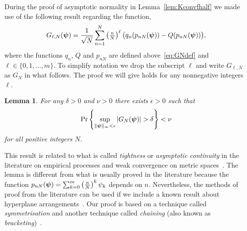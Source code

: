 \documentclass[aap,preprint]{imsart}
\newcommand{\prob}{\operatorname{Pr}}
\newcommand{\abs}[1]{\left\vert #1 \right\vert}
\newtheorem{lemma}{Lemma}
\begin{document}
During the proof of asymptotic normality in Lemma~\ref{lem:Kconvfhalf} we made use of the following result regarding the function,
\[
G_{\ell,N}(\boldsymbol{\psi}) = \frac{1}{\sqrt{N}} \sum_{n=1}^{N}\left( \tfrac{n}{N}\right)^\ell  \big(q_n(p_{nN}(\boldsymbol{\psi})) - Q(p_{nN}(\boldsymbol{\psi})) \big),
\]
where the functions $q_n$, $Q$ and $p_{nN}$ are defined above~\eqref{eq:GNdef} and $\ell \in \{0, 1, \dots, m\}$.  To simplify notation we drop the subscript $\ell$ and write $G_{\ell,N}$ as $G_N$ in what follows.  The proof we will give holds for any nonnegative integers $\ell$.

\begin{lemma}\label{lem:unifprobG}
For any $\delta >0$ and $\nu > 0$ there exists $\epsilon > 0$ such that
\[
\prob\left\{ \sup_{\|\psibf\|_{\infty} < \epsilon} \abs{ G_N(\psibf) } > \delta   \right\} < \nu %
\]
for all positive integers $N$.
\end{lemma}

This result is related to what is called \emph{tightness} or \emph{asymptotic continuity} in the literature on empirical processes and weak convergence on metric spaces~\cite{Billingsley1999_convergence_of_probability_measures,Dudley_unif_central_lim_th_1999,Shorak_emp_proc_stat_2009,van2009empirical}.  The lemma is different from what is usually proved in the literature because the function $p_{nN}(\boldsymbol{\psi}) = \sum_{k=0}^m\left( \tfrac{n}{N}\right)^k\psi_k$
depends on $n$.  Nevertheless, the methods of proof from the literature can be used if we include a known result about hyperplane arrangements~\cite[Ch. 5]{Chazelle_discrepency_method_2000}\cite[Ch. 6]{Matousek_lect_disc_geom_2002}. Our proof is based on a technique called \emph{symmetrisation} and another technique called \emph{chaining} (also known as \emph{bracketing})~\cite{Pollard_asymp_empi_proc_1989,van2009empirical}.
\end{document}
